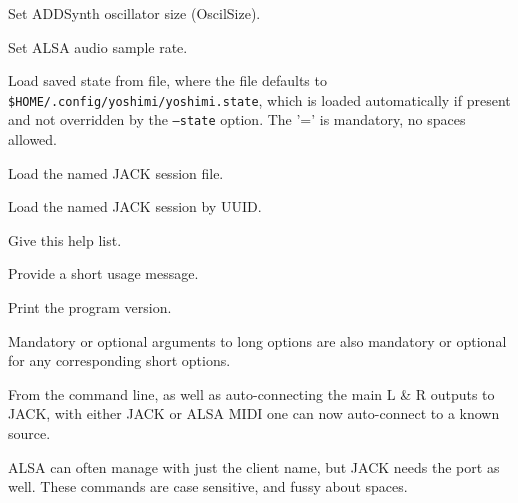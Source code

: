      Set ADDSynth oscillator size (OscilSize).

      Set ALSA audio sample rate.

      Load saved state from file, where the file defaults to
      \texttt{\$HOME/.config/yoshimi/yoshimi.state}, which is loaded
      automatically if present and not overridden by the \texttt{--state}
      option. The '=' is mandatory, no spaces allowed.

      Load the named JACK session file.

      Load the named JACK session by UUID.

      Give this help list.

      Provide a short usage message.

      Print the program version.

   Mandatory or optional arguments to long options are also mandatory or
   optional for any corresponding short options.

   From the command line, as well as auto-connecting the main L \& R outputs
   to JACK, with either JACK or ALSA MIDI one can now auto-connect to a
   known source.

   ALSA can often manage with just the client name, but JACK needs the port
   as well. These commands are case sensitive, and fussy about spaces.

